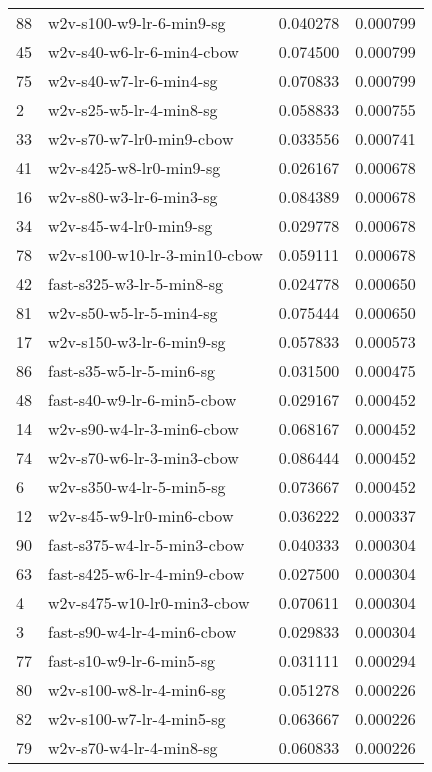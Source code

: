 {\begin{tabular}{llrr}
88 &      w2v-s100-w9-lr-6-min9-sg &  0.040278 &  0.000799 \\
45 &     w2v-s40-w6-lr-6-min4-cbow &  0.074500 &  0.000799 \\
75 &       w2v-s40-w7-lr-6-min4-sg &  0.070833 &  0.000799 \\
2  &       w2v-s25-w5-lr-4-min8-sg &  0.058833 &  0.000755 \\
33 &      w2v-s70-w7-lr0-min9-cbow &  0.033556 &  0.000741 \\
41 &       w2v-s425-w8-lr0-min9-sg &  0.026167 &  0.000678 \\
16 &       w2v-s80-w3-lr-6-min3-sg &  0.084389 &  0.000678 \\
34 &        w2v-s45-w4-lr0-min9-sg &  0.029778 &  0.000678 \\
78 &  w2v-s100-w10-lr-3-min10-cbow &  0.059111 &  0.000678 \\
42 &     fast-s325-w3-lr-5-min8-sg &  0.024778 &  0.000650 \\
81 &       w2v-s50-w5-lr-5-min4-sg &  0.075444 &  0.000650 \\
17 &      w2v-s150-w3-lr-6-min9-sg &  0.057833 &  0.000573 \\
86 &      fast-s35-w5-lr-5-min6-sg &  0.031500 &  0.000475 \\
48 &    fast-s40-w9-lr-6-min5-cbow &  0.029167 &  0.000452 \\
14 &     w2v-s90-w4-lr-3-min6-cbow &  0.068167 &  0.000452 \\
74 &     w2v-s70-w6-lr-3-min3-cbow &  0.086444 &  0.000452 \\
6  &      w2v-s350-w4-lr-5-min5-sg &  0.073667 &  0.000452 \\
12 &      w2v-s45-w9-lr0-min6-cbow &  0.036222 &  0.000337 \\
90 &   fast-s375-w4-lr-5-min3-cbow &  0.040333 &  0.000304 \\
63 &   fast-s425-w6-lr-4-min9-cbow &  0.027500 &  0.000304 \\
4  &    w2v-s475-w10-lr0-min3-cbow &  0.070611 &  0.000304 \\
3  &    fast-s90-w4-lr-4-min6-cbow &  0.029833 &  0.000304 \\
77 &      fast-s10-w9-lr-6-min5-sg &  0.031111 &  0.000294 \\
80 &      w2v-s100-w8-lr-4-min6-sg &  0.051278 &  0.000226 \\
82 &      w2v-s100-w7-lr-4-min5-sg &  0.063667 &  0.000226 \\
79 &       w2v-s70-w4-lr-4-min8-sg &  0.060833 &  0.000226 \\

\end{tabular}}

